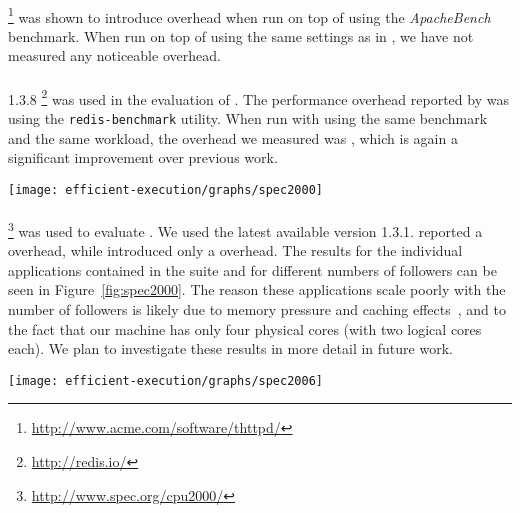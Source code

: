 \paragraph{\thttpd}\footnote{\url{http://www.acme.com/software/thttpd/}}
was shown to introduce \tachyonThttpd overhead when run on top of
\tachyon using the \emph{ApacheBench} benchmark. When run on top of
\varan using the same settings as in \cite{tachyon12}, we have not
measured any noticeable overhead.

\paragraph{\redis} 1.3.8 \footnote{\url{http://redis.io/}}
was used in the evaluation of \mx.  The performance
overhead reported by \mx was \mxRedis using the \lstinline`redis-benchmark`
utility. When run with \varan using the same benchmark and the same workload,
the overhead we measured was \redisOneFollower, which is again a significant
improvement over previous work.

\begin{figure*}[!t]
  \centering
  \texttt{[image: efficient-execution/graphs/spec2000]}
  \caption{\speczerozero performance overhead for different numbers of followers.}
  \label{fig:spec2000}
\end{figure*}

\paragraph{\speczerozero}\footnote{\url{http://www.spec.org/cpu2000/}} 
was used to evaluate \orchestra.  We used the latest available version
1.3.1.  \orchestra reported a \orchestraSpec overhead, while \varan
introduced only a \speczerozeroOneFollower overhead. The results for
the individual applications contained in the \speczerozero suite and
for different numbers of followers can be seen in
Figure~\ref{fig:spec2000}. The reason these applications scale poorly
with the number of followers is likely due to memory pressure and
caching effects~\cite{jaleel07}, and to the fact that our machine has
only four physical cores (with two logical cores each).  We plan to
investigate these results in more detail in future work.

\begin{figure*}[!t]
  \centering
  \texttt{[image: efficient-execution/graphs/spec2006]}
  \caption{\speczerosix performance overhead for different numbers of followers.}
  \label{fig:spec2006}
\end{figure*}

